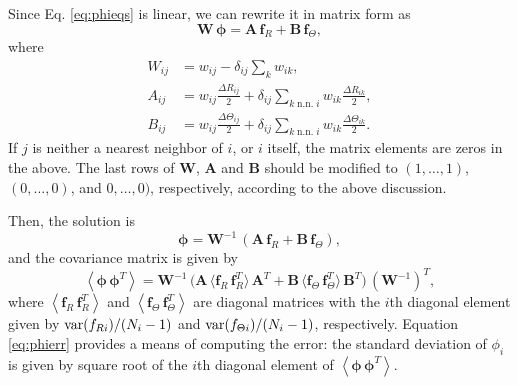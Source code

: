 \documentclass{article}
\begin{document}
Since Eq. \eqref{eq:phieqs} is linear,
we can rewrite it in matrix form as
\begin{equation*}
\mathbf W \, \pmb\phi = \mathbf A \, \mathbf f_R + \mathbf B \, \mathbf f_\Theta,
\end{equation*}
where
\begin{align*}
  W_{ij}
  &=
  w_{ij} - \delta_{ij} \sum_k w_{ik}
  ,
  \\
  A_{ij}
  &=
  w_{ij} \frac{ \Delta R_{ij} } { 2 }
  +
  \delta_{ij}
  \sum_{k \mathrm{\; n.n. \; } i }
  w_{ik} \frac{ \Delta R_{ik} } { 2 }
  ,
  \\
  B_{ij}
  &=
  w_{ij} \frac{ \Delta \Theta_{ij} } { 2 }
  +
  \delta_{ij}
  \sum_{k \mathrm{\; n.n. \; } i }
  w_{ik} \frac{ \Delta \Theta_{ik} } { 2 }
  .
\end{align*}
If $j$ is neither a nearest neighbor of $i$, or $i$ itself,
the matrix elements are zeros in the above.
%
The last rows of $\mathbf W$, $\mathbf A$ and $\mathbf B$
should be modified to
$(1, \dots, 1)$, $(0, \dots, 0)$, and $0, \dots, 0)$,
respectively,
according to the above discussion.




Then, the solution is
\begin{equation}
\pmb\phi = \mathbf W^{-1} \, ( \mathbf A \, \mathbf f_R + \mathbf B \, \mathbf f_\Theta ),
\label{eq:phif}
\end{equation}
and the covariance matrix is given by
\begin{equation}
  \left\langle
    \pmb\phi \, \pmb\phi^T
  \right\rangle
  =
  \mathbf W^{-1} \,
  \bigl(
    \mathbf A \, \langle \mathbf f_R \, \mathbf f_R^T \rangle \, \mathbf A^T
    +
    \mathbf B \, \langle \mathbf f_\Theta \, \mathbf f_\Theta^T \rangle \, \mathbf B^T
  \bigr) \,
  (\mathbf W^{-1})^T
  ,
\label{eq:phierr}
\end{equation}
where
$\left\langle \mathbf f_R \, \mathbf f_R^T \right\rangle$
and
$\left\langle \mathbf f_\Theta \, \mathbf f_\Theta^T \right\rangle$
are diagonal matrices with the $i$th diagonal element given by
$\mathrm{var}(f_{R i})/(N_i - 1)$ and
$\mathrm{var}(f_{\Theta i})/(N_i - 1)$, respectively.
%
Equation \eqref{eq:phierr} provides a means of computing the error:
the standard deviation of $\phi_i$
is given by square root of the $i$th diagonal element
of $\left\langle \pmb\phi \, \pmb\phi^T \right\rangle$.



%
%
\end{document}
